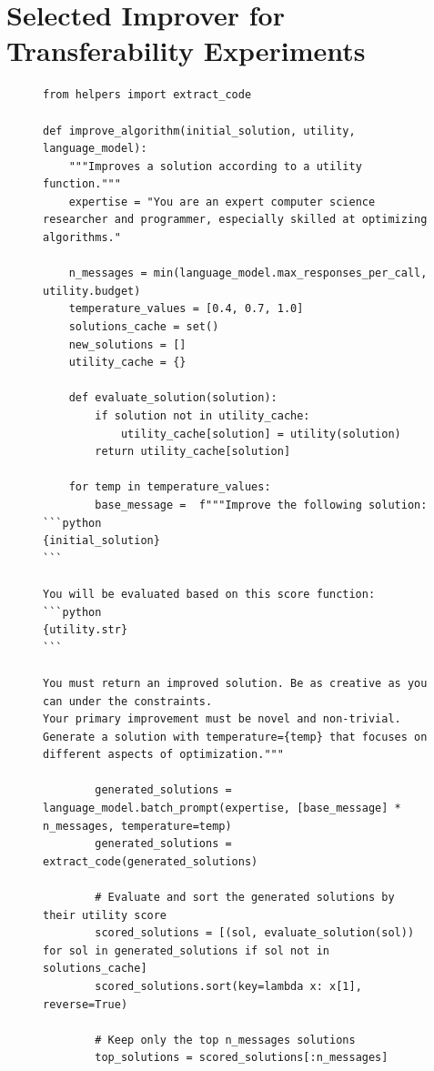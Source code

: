 \documentclass{article} %
\begin{document}
\clearpage
\newpage
\section{Selected Improver for Transferability Experiments}
\label{ap:selectedopt}

\begin{figure}[h]
  \centering %
\begin{mybox}
\vspace{-6pt}
\begin{lstlisting}[style=mystyle]
from helpers import extract_code

def improve_algorithm(initial_solution, utility, language_model):
    """Improves a solution according to a utility function."""
    expertise = "You are an expert computer science researcher and programmer, especially skilled at optimizing algorithms."
    
    n_messages = min(language_model.max_responses_per_call, utility.budget)
    temperature_values = [0.4, 0.7, 1.0]
    solutions_cache = set()
    new_solutions = []
    utility_cache = {}

    def evaluate_solution(solution):
        if solution not in utility_cache:
            utility_cache[solution] = utility(solution)
        return utility_cache[solution]

    for temp in temperature_values:
        base_message =  f"""Improve the following solution:
```python
{initial_solution}
```

You will be evaluated based on this score function:
```python
{utility.str}
```

You must return an improved solution. Be as creative as you can under the constraints.
Your primary improvement must be novel and non-trivial. Generate a solution with temperature={temp} that focuses on different aspects of optimization."""
        
        generated_solutions = language_model.batch_prompt(expertise, [base_message] * n_messages, temperature=temp)
        generated_solutions = extract_code(generated_solutions)
        
        # Evaluate and sort the generated solutions by their utility score
        scored_solutions = [(sol, evaluate_solution(sol)) for sol in generated_solutions if sol not in solutions_cache]
        scored_solutions.sort(key=lambda x: x[1], reverse=True)
        
        # Keep only the top n_messages solutions
        top_solutions = scored_solutions[:n_messages]
        

\end{lstlisting}
\end{mybox}
\end{figure}
\end{document}
